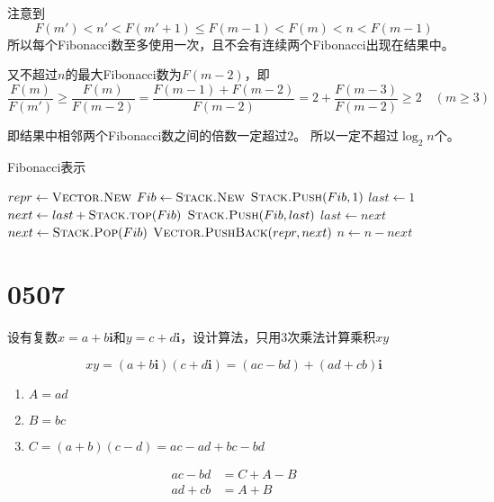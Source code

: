 \documentclass[answers]{exam}
\begin{document}
\begin{questions}
\begin{solution}
        注意到\[
            F(m') < n' < F(m' + 1) \le F(m-1) < F(m) < n < F(m-1)
        \]
        所以每个Fibonacci数至多使用一次，且不会有连续两个Fibonacci出现在结果中。

        又不超过$n$的最大Fibonacci数为$F(m-2)$，即\[
            \frac{F(m)}{F(m')}
            \ge \frac{F(m)}{F(m-2)}
            = \frac{F(m-1) + F(m-2)}{F(m-2)} = 2 + \frac{F(m-3)}{F(m-2)}
            \ge 2
            \quad (m \ge 3)
        \]

        即结果中相邻两个Fibonacci数之间的倍数一定超过$2$。
        所以一定不超过$\log_2{n}$个。

    \end{solution}

    \begin{algorithm}[!ht]
        \caption{Fibonacci表示}\label{alg:0430:3}
        \begin{algorithmic}[1]
            \State $repr \gets \Call{Vector.New}{}$
            \State $Fib \gets \Call{Stack.New}{}$
            \State $\Call{Stack.Push}{Fib, 1}$
            \State $last \gets 1$
            \Repeat
            \State $next \gets last + \Call{Stack.top}{Fib}$
            \State $\Call{Stack.Push}{Fib, last}$
            \State $last \gets next$
            \Repeat
            \State $next \gets \Call{Stack.Pop}{Fib}$
            \State $\Call{Vector.PushBack}{repr, next}$
            \State $n \gets n - next$
            \EndIf
        \end{algorithmic}
    \end{algorithm}

    \newpage %
    \section{0507}\label{sec:0507}

    \question 设有复数$x=a+b \bm i$和$y=c+d \bm i$，设计算法，只用3次乘法计算乘积$xy$
    \begin{solution}
        \[
            xy = (a+b \bm i) (c+d \bm i) = (ac-bd) + (ad+cb) \bm i
        \]
        \begin{enumerate}
            \item $A = ad                             $
            \item $B = bc                             $
            \item $C = (a+b)(c-d) = ac - ad + bc - bd $
        \end{enumerate}
        \begin{align*}
            ac-bd & = C + A - B \\
            ad+cb & = A + B
        \end{align*}
    \end{solution}


\end{questions}
\end{document}
